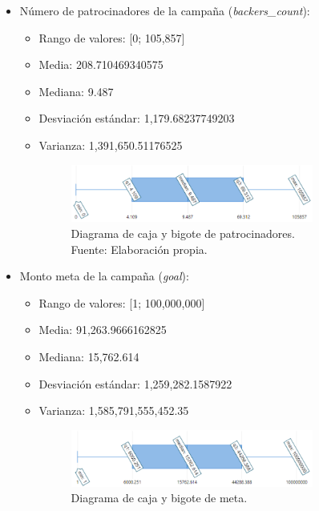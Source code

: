 \begin{itemize}
	\item Número de patrocinadores de la campaña (\textit{backers\_count}):
	\begin{itemize}
		\item Rango de valores: [0; 105,857]
		\item Media: 208.710469340575
		\item Mediana: 9.487
		\item Desviación estándar: 1,179.68237749203
		\item Varianza: 1,391,650.51176525
		\begin{figure}[!ht]
			\begin{center}
				\includegraphics[width=0.80\textwidth]{4/figures/caja_bigote_backers.png}
				\caption[Diagrama de caja y bigote de patrocinadores]{Diagrama de caja y bigote de patrocinadores.\\
					Fuente: Elaboración propia.}
				\label{4:fig16}
			\end{center}
		\end{figure}
	\end{itemize}
	\item Monto meta de la campaña (\textit{goal}):
	\begin{itemize}
		\item Rango de valores: [1; 100,000,000]
		\item Media: 91,263.9666162825
		\item Mediana: 15,762.614
		\item Desviación estándar: 1,259,282.1587922
		\item Varianza: 1,585,791,555,452.35
		\begin{figure}[!ht]
			\begin{center}
				\includegraphics[width=0.80\textwidth]{4/figures/caja_bigote_goal.png}
				\caption[Diagrama de caja y bigote de meta]{Diagrama de caja y bigote de meta.\\
}
\end{center}
\end{figure}
\end{itemize}
\end{itemize}
